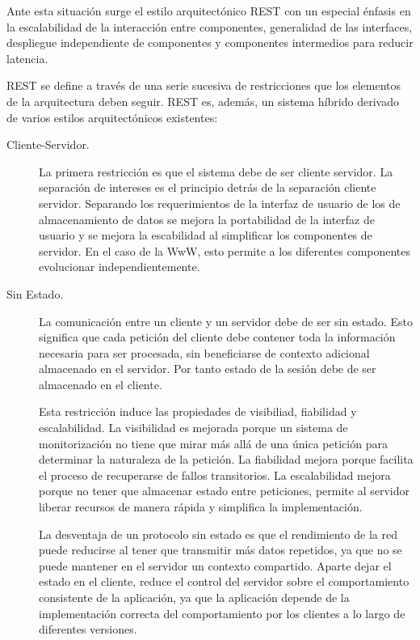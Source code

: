 Ante esta situación surge el estilo arquitectónico REST con un
especial énfasis en la escalabilidad de la interacción entre
componentes, generalidad de las interfaces, despliegue independiente
de componentes y componentes intermedios para reducir latencia.

REST se define a través de una serie sucesiva de restricciones que los
elementos de la arquitectura deben seguir. REST es, además, un sistema
híbrido derivado de varios estilos arquitectónicos existentes:

\begin{description}

\item[Cliente-Servidor.] La primera restricción es que el sistema debe
  de ser cliente servidor. La separación de intereses es el principio
  detrás de la separación cliente servidor. Separando los
  requerimientos de la interfaz de usuario de los de almacenamiento de
  datos se mejora la portabilidad de la interfaz de usuario y se
  mejora la escabilidad al simplificar los componentes de servidor. En
  el caso de la WwW, esto permite a los diferentes componentes
  evolucionar independientemente.

\item[Sin Estado.] La comunicación entre un cliente y un servidor debe
  de ser sin estado. Esto significa que cada petición del cliente debe
  contener toda la información necesaria para ser procesada, sin
  beneficiarse de contexto adicional almacenado en el servidor. Por
  tanto estado de la sesión debe de ser almacenado en el cliente.

  Esta restricción induce las propiedades de visibiliad, fiabilidad y
  escalabilidad. La visibilidad es mejorada porque un sistema de
  monitorización no tiene que mirar más allá de una única petición
  para determinar la naturaleza de la petición. La fiabilidad mejora
  porque facilita el proceso de recuperarse de fallos transitorios. La
  escalabilidad mejora porque no tener que almacenar estado entre
  peticiones, permite al servidor liberar recursos de manera rápida y
  simplifica la implementación.

  La desventaja de un protocolo sin estado es que el rendimiento de la
  red puede reducirse al tener que transmitir más datos repetidos, ya
  que no se puede mantener en el servidor un contexto
  compartido. Aparte dejar el estado en el cliente, reduce el control
  del servidor sobre el comportamiento consistente de la aplicación,
  ya que la aplicación depende de la implementación correcta del
  comportamiento por los clientes a lo largo de diferentes versiones.


\end{description}
